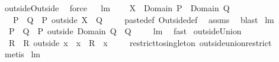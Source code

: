 \begin{isabellebody}
\ outsideOutside\ \isamarkupfalse%
\ force%
\endisatagproof
{\isafoldproof}%
%
\isadelimproof
\ \isanewline
%
\endisadelimproof
\isanewline
{}\isamarkupfalse%
\ lm{}{}{}{\isacharcolon}\ \isanewline
\ \ \ {\isachardoublequoteopen}{\isacharparenleft}X\ {\isasyminter}\ Domain\ P{\isacharparenright}\ {\isasymsubseteq}\ Domain\ Q{\isachardoublequoteclose}\ \isanewline
\ \ \ {\isachardoublequoteopen}P\ {\isacharplus}{\isacharasterisk}\ Q\ {\isacharequal}\ {\isacharparenleft}P\ outside\ X{\isacharparenright}\ {\isacharplus}{\isacharasterisk}\ Q{\isachardoublequoteclose}\ \isanewline
%
\isadelimproof
\ \ %
\endisadelimproof
%
\isatagproof
{}\isamarkupfalse%
\ paste{\isacharunderscore}def\ Outside{\isacharunderscore}def\ \isamarkupfalse%
\ assms\ \isamarkupfalse%
\ blast%
\endisatagproof
{\isafoldproof}%
%
\isadelimproof
\isanewline
%
\endisadelimproof
\isanewline
{}\isamarkupfalse%
\ lm{}{}{}{\isacharcolon}\ \isanewline
\ \ {\isachardoublequoteopen}P\ {\isacharplus}{\isacharasterisk}\ Q\ {\isacharequal}\ {\isacharparenleft}P\ outside\ {\isacharparenleft}Domain\ Q{\isacharparenright}{\isacharparenright}\ {\isacharplus}{\isacharasterisk}\ Q{\isachardoublequoteclose}\ \isanewline
%
\isadelimproof
\ \ %
\endisadelimproof
%
\isatagproof
{}\isamarkupfalse%
\ lm{}{}{}\ \isamarkupfalse%
\ fast%
\endisatagproof
{\isafoldproof}%
%
\isadelimproof
\isanewline
%
\endisadelimproof
\isanewline
{}\isamarkupfalse%
\ outsideUnion{\isacharcolon}\ \isanewline
\ \ {\isachardoublequoteopen}R\ {\isacharequal}\ {\isacharparenleft}R\ outside\ {\isacharbraceleft}x{\isacharbraceright}{\isacharparenright}\ {\isasymunion}\ {\isacharparenleft}{\isacharbraceleft}x{\isacharbraceright}\ {\isasymtimes}\ {\isacharparenleft}R\ {\isacharbackquote}{\isacharbackquote}\ {\isacharbraceleft}x{\isacharbraceright}{\isacharparenright}{\isacharparenright}{\isachardoublequoteclose}\ \isanewline
%
\isadelimproof
\ \ %
\endisadelimproof
%
\isatagproof
{}\isamarkupfalse%
\ restrict{\isacharunderscore}to{\isacharunderscore}singleton\ outside{\isacharunderscore}union{\isacharunderscore}restrict\ \isamarkupfalse%
\ metis%
\endisatagproof
{\isafoldproof}%
%
\isadelimproof
\isanewline
%
\endisadelimproof
\isanewline
{}\isamarkupfalse%
\ lm{}{}{}{\isacharcolon}\ \isanewline

\end{isabellebody}
